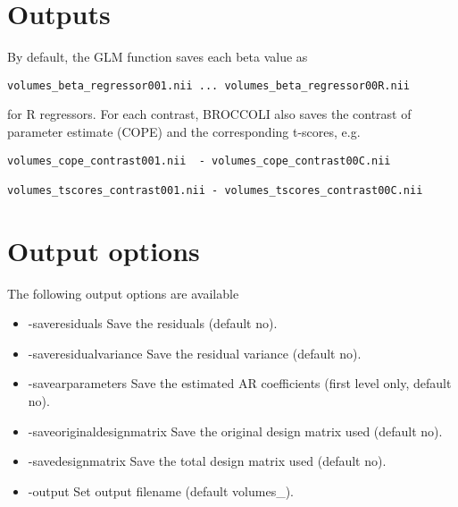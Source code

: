 \section{Outputs}

By default, the GLM function saves each beta value as 

\begin{verbatim}
volumes_beta_regressor001.nii ... volumes_beta_regressor00R.nii
\end{verbatim}
for R regressors. For each contrast, BROCCOLI also saves the contrast of parameter estimate (COPE) and the corresponding t-scores, e.g.

\begin{verbatim}
volumes_cope_contrast001.nii  - volumes_cope_contrast00C.nii

volumes_tscores_contrast001.nii - volumes_tscores_contrast00C.nii
\end{verbatim}

\section{Output options}

The following output options are available

\begin{itemize}


\item -saveresiduals
\newline \newline Save the residuals (default no). 

\item -saveresidualvariance
\newline \newline Save the residual variance (default no).

\item -savearparameters
\newline \newline Save the estimated AR coefficients (first level only, default no).

\item -saveoriginaldesignmatrix
\newline \newline Save the original design matrix used (default no).

\item -savedesignmatrix
\newline \newline Save the total design matrix used (default no).

\item -output 
\newline \newline Set output filename (default volumes\_).

\end{itemize}

